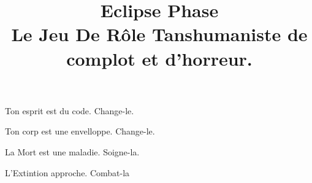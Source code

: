 \documentclass{book}
\begin{document}
 

\title{Eclipse Phase\\ Le Jeu De Rôle Tanshumaniste de complot et d'horreur.} \date{} 

\maketitle



\begin{frontmatter} 

\begin{center} Ton esprit est du code. Change-le. 

Ton corp est une envelloppe. Change-le. 

La Mort est une maladie. Soigne-la. 

L'Extintion approche. Combat-la \end{center} 

\newpage



 

\tableofcontents



\end{frontmatter} 

\begin{mainmatter} 

              

\end{mainmatter} 
\end{document}
